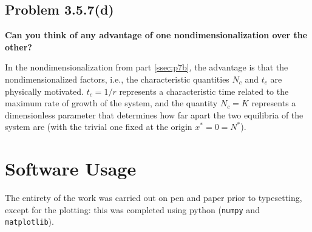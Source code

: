 \documentclass[draft]{agujournal2019}
\begin{document}
\subsection{Problem 3.5.7(d)}
\label{ssec:p7d}

\textbf{Can you think of any advantage of one nondimensionalization over the other?}

In the nondimensionalization from part \ref{ssec:p7b}, the advantage is that the nondimensionalized factors, i.e., the characteristic quantities $N_c$ and $t_c$ are physically motivated. $t_c = 1/r$ represents a characteristic time related to the maximum rate of growth of the system, and the quantity $N_c=K$ represents a dimensionless parameter that determines how far apart the two equilibria of the system are (with the trivial one fixed at the origin $x^*=0=N^*$).









\clearpage
\section{Software Usage}
The entirety of the work was carried out on pen and paper prior to typesetting, except for the plotting: this was completed using python (\verb|numpy| and \verb|matplotlib|). 

\newpage















%
\end{document}
